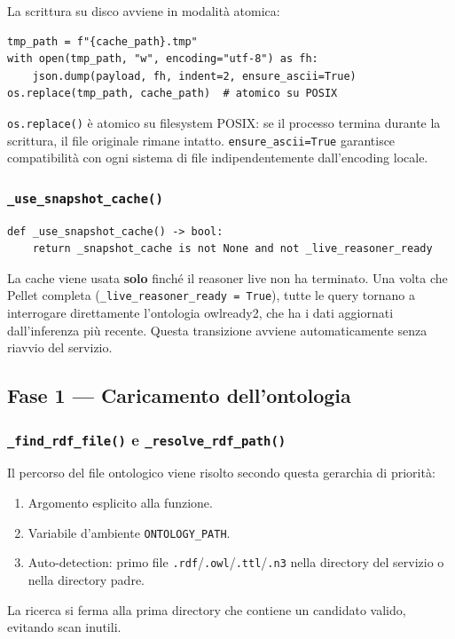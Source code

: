 \documentclass[a4paper,12pt]{article}
\begin{document}
La scrittura su disco avviene in modalit\`{a} atomica:
\begin{lstlisting}[caption={Scrittura atomica della cache su disco.}]
tmp_path = f"{cache_path}.tmp"
with open(tmp_path, "w", encoding="utf-8") as fh:
    json.dump(payload, fh, indent=2, ensure_ascii=True)
os.replace(tmp_path, cache_path)  # atomico su POSIX
\end{lstlisting}

\noindent \texttt{os.replace()} \`{e} atomico su filesystem POSIX: se il processo
termina durante la scrittura, il file originale rimane intatto.
\texttt{ensure\_ascii=True} garantisce compatibilit\`{a} con ogni
sistema di file indipendentemente dall'encoding locale.

\subsubsection{\texttt{\_use\_snapshot\_cache()}}

\begin{lstlisting}[caption={Condizione di utilizzo della cache.}]
def _use_snapshot_cache() -> bool:
    return _snapshot_cache is not None and not _live_reasoner_ready
\end{lstlisting}

\noindent La cache viene usata \textbf{solo} finch\'{e} il reasoner live non ha
terminato. Una volta che Pellet completa (\texttt{\_live\_reasoner\_ready
= True}), tutte le query tornano a interrogare direttamente l'ontologia
owlready2, che ha i dati aggiornati dall'inferenza pi\`{u} recente.
Questa transizione avviene automaticamente senza riavvio del servizio.

\subsection{Fase 1 --- Caricamento dell'ontologia}

\subsubsection{\texttt{\_find\_rdf\_file()} e \texttt{\_resolve\_rdf\_path()}}

Il percorso del file ontologico viene risolto secondo questa gerarchia
di priorit\`{a}:
\begin{enumerate}[noitemsep]
  \item Argomento esplicito alla funzione.
  \item Variabile d'ambiente \texttt{ONTOLOGY\_PATH}.
  \item Auto-detection: primo file \texttt{.rdf}/\texttt{.owl}/\texttt{.ttl}/\texttt{.n3}
        nella directory del servizio o nella directory padre.
\end{enumerate}
La ricerca si ferma alla prima directory che contiene un candidato
valido, evitando scan inutili.
\end{document}
